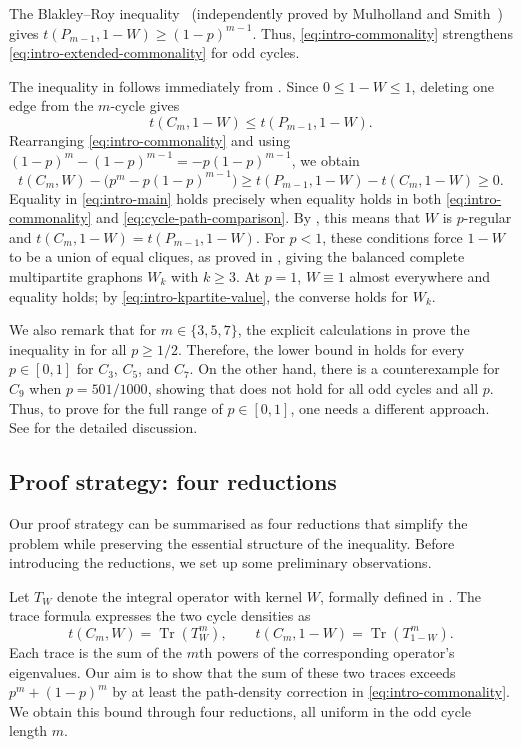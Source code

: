 \documentclass[11pt]{article}
\theoremstyle{remark}
\numberwithin{equation}{section}
\newcommand{\Tr}{\operatorname{Tr}}
\newcommand{\tC}[2]{t(C_{#1},#2)}
\newcommand{\tP}[2]{t(P_{#1},#2)}
\newcommand{\goodman}[2]{#1^{#2}-#1(1-#1)^{#2-1}}
\newcommand{\goal}{\goodman{p}{m}}
\newcommand{\Tker}[1]{T_{#1}}
\begin{document}
The Blakley--Roy inequality~\cite{blakley1965holder} (independently proved by Mulholland and Smith~\cite{mulholland1959inequality}) gives $\tP{m-1}{1-W}\ge(1-p)^{m-1}$.
Thus, \eqref{eq:intro-commonality} strengthens \eqref{eq:intro-extended-commonality} for odd cycles.

The inequality in  follows immediately from .
Since $0\le1-W\le1$, deleting one edge from the $m$-cycle gives
\begin{equation}\label{eq:cycle-path-comparison}
  \tC m{1-W}\le\tP{m-1}{1-W}.
\end{equation}
Rearranging \eqref{eq:intro-commonality} and using $(1-p)^m-(1-p)^{m-1}=-p(1-p)^{m-1}$, we obtain
\[
  \tC mW-\bigl(\goal\bigr)\ge\tP{m-1}{1-W}-\tC m{1-W}\ge0.
\]
Equality in \eqref{eq:intro-main} holds precisely when equality holds in both \eqref{eq:intro-commonality} and \eqref{eq:cycle-path-comparison}.
By , this means that $W$ is $p$-regular and $\tC m{1-W}=\tP{m-1}{1-W}$.
For $p<1$, these conditions force $1-W$ to be a union of equal cliques, as proved in , giving the balanced complete multipartite graphons $W_k$ with $k\ge3$.
At $p=1$, $W\equiv1$ almost everywhere and equality holds; by \eqref{eq:intro-kpartite-value}, the converse holds for $W_k$.

We also remark that for $m\in\{3,5,7\}$, the explicit calculations in  prove the inequality in  for all $p\ge1/2$.
Therefore, the lower bound in  holds for every $p\in[0,1]$ for $C_3$, $C_5$, and $C_7$.
On the other hand, there is a counterexample for $C_9$ when $p = 501/1000$, showing that  does not hold for all odd cycles and all $p$. Thus, to prove  for the full range of $p\in[0,1]$, one needs a different approach.
See  for the detailed discussion.

\subsection{Proof strategy: four reductions}
Our proof strategy can be summarised as four reductions that simplify the problem while preserving the essential structure of the inequality.
Before introducing the reductions, we set up some preliminary observations.

Let $\Tker W$ denote the integral operator with kernel $W$, formally defined in .
The trace formula expresses the two cycle densities as
\[
  \tC mW=\Tr(\Tker W^m),
  \qquad
  \tC m{1-W}=\Tr(\Tker{1-W}^m).
\]
Each trace is the sum of the $m$th powers of the corresponding operator's eigenvalues.
Our aim is to show that the sum of these two traces exceeds $p^m+(1-p)^m$ by at least the path-density correction in \eqref{eq:intro-commonality}.
We obtain this bound through four reductions, all uniform in the odd cycle length $m$.
\end{document}
